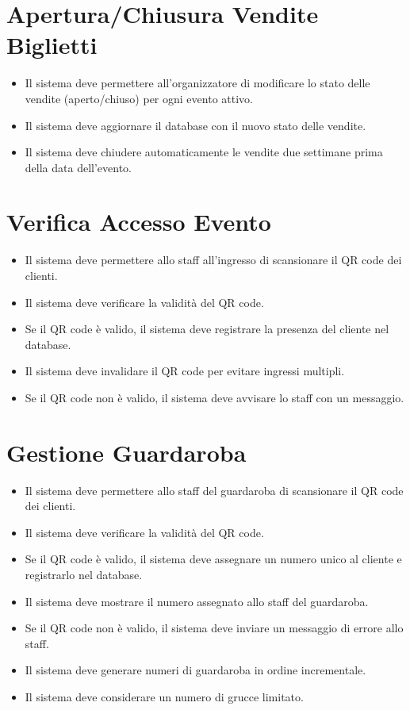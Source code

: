 \documentclass[a4paper,12pt]{article}
\begin{document}
\section*{\textcolor{sectioncolor}{Apertura/Chiusura Vendite Biglietti}}
\textcolor{textcolor}{
\begin{itemize}
    \item Il sistema deve permettere all’organizzatore di modificare lo stato delle vendite (aperto/chiuso) per ogni evento attivo.
    \item Il sistema deve aggiornare il database con il nuovo stato delle vendite.
    \item Il sistema deve chiudere automaticamente le vendite due settimane prima della data dell'evento.
\end{itemize}
}

\section*{\textcolor{sectioncolor}{Verifica Accesso Evento}}
\textcolor{textcolor}{
\begin{itemize}
    \item Il sistema deve permettere allo staff all’ingresso di scansionare il QR code dei clienti.
    \item Il sistema deve verificare la validità del QR code.
    \item Se il QR code è valido, il sistema deve registrare la presenza del cliente nel database.
    \item Il sistema deve invalidare il QR code per evitare ingressi multipli.
    \item Se il QR code non è valido, il sistema deve avvisare lo staff con un messaggio.
\end{itemize}
}

\section*{\textcolor{sectioncolor}{Gestione Guardaroba}}
\textcolor{textcolor}{
\begin{itemize}
    \item Il sistema deve permettere allo staff del guardaroba di scansionare il QR code dei clienti.
    \item Il sistema deve verificare la validità del QR code.
    \item Se il QR code è valido, il sistema deve assegnare un numero unico al cliente e registrarlo nel database.
    \item Il sistema deve mostrare il numero assegnato allo staff del guardaroba.
    \item Se il QR code non è valido, il sistema deve inviare un messaggio di errore allo staff.
    \item Il sistema deve generare numeri di guardaroba in ordine incrementale.
    \item Il sistema deve considerare un numero di grucce limitato.
\end{itemize}
}
\end{document}
